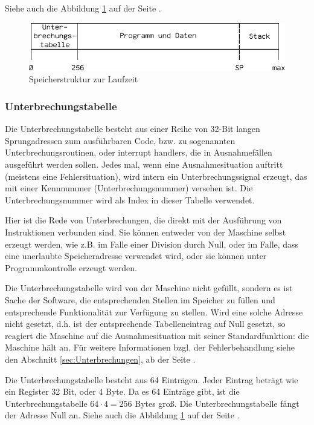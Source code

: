 Siehe auch die Abbildung \ref{fig:Speicherstruktur} auf der Seite
\pageref{fig:Speicherstruktur}.

\begin{figure}[htp]
 \centering
 \includegraphics{./img/UMach-Speicherstruktur}
 \caption[Speicherstruktur]{Speicherstruktur zur Laufzeit}
 \label{fig:Speicherstruktur}
\end{figure}



\subsubsection{Unterbrechungstabelle}
\label{subsubsec:Unterbrechungstabelle}

Die Unterbrechungstabelle besteht aus einer Reihe von 32-Bit langen
Sprungadressen zum ausführbaren Code, bzw. zu sogenannten
Unterbrechungsroutinen, oder \glqq interrupt handlers\grqq, die in
Ausnahmefällen ausgeführt werden sollen. Jedes mal, wenn eine Ausnahmesituation
auftritt (meistens eine Fehlersituation), wird intern ein Unterbrechungssignal
erzeugt, das mit einer Kennnummer (Unterbrechungsnummer) versehen ist. Die
Unterbrechungsnummer wird als Index in dieser Tabelle verwendet.

Hier ist die Rede von Unterbrechungen, die direkt mit der Ausführung von
Instruktionen verbunden sind. Sie können entweder von der Maschine selbst
erzeugt werden, wie z.B. im Falle einer Division durch Null, oder im Falle, dass
eine unerlaubte Speicheradresse verwendet wird, oder sie können unter
Programmkontrolle erzeugt werden. 


Die Unterbrechungstabelle wird von der Maschine nicht gefüllt, sondern es ist
Sache der Software, die entsprechenden Stellen im Speicher zu füllen und
entsprechende Funktionalität zur Verfügung zu stellen. Wird eine solche Adresse
nicht gesetzt, d.h. ist der entsprechende Tabelleneintrag auf Null gesetzt, so
reagiert die Maschine auf die Ausnahmesituation mit seiner Standardfunktion: die
Maschine hält an. Für weitere Informationen bzgl. der Fehlerbehandlung siehe den
Abschnitt \ref{sec:Unterbrechungen}, ab der Seite \pageref{sec:Unterbrechungen}.

Die Unterbrechungstabelle besteht aus 64 Einträgen. Jeder Eintrag beträgt wie
ein Register 32 Bit, oder 4 Byte. Da es 64 Einträge gibt, ist die
Unterbrechungstabelle $64 \cdot 4 = 256$ Bytes groß. Die Unterbrechungstabelle
fängt der Adresse Null an. Siehe auch die Abbildung \ref{fig:Speicherstruktur}
auf der Seite \pageref{fig:Speicherstruktur}.

